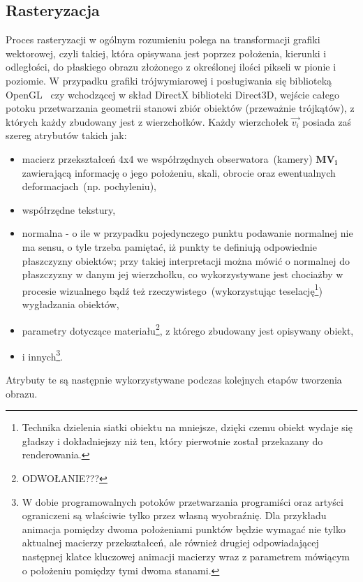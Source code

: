 \subsection{Rasteryzacja}
Proces rasteryzacji w ogólnym rozumieniu polega na transformacji grafiki wektorowej, czyli takiej, która opisywana jest poprzez położenia, kierunki i odległości, do płaskiego obrazu złożonego z określonej ilości pikseli w pionie i poziomie. W przypadku grafiki trójwymiarowej i posługiwania się biblioteką OpenGL~\cite{OPENGL46} czy wchodzącej w skład DirectX biblioteki Direct3D, wejście całego potoku przetwarzania geometrii stanowi zbiór obiektów (przeważnie trójkątów), z których każdy zbudowany jest z wierzchołków. Każdy wierzchołek $\vec{v_i}$ posiada zaś szereg atrybutów takich jak:
\begin{itemize}
\item macierz przekształceń 4x4 we współrzędnych obserwatora~(kamery) $\mathbf{MV_i}$ zawierającą informację o jego położeniu, skali, obrocie oraz ewentualnych deformacjach~(np. pochyleniu),
\item współrzędne tekstury,
\item normalna - o ile w przypadku pojedynczego punktu podawanie normalnej nie ma sensu, o tyle trzeba pamiętać, iż punkty te definiują odpowiednie płaszczyzny obiektów; przy takiej interpretacji można mówić o normalnej do płaszczyzny w danym jej wierzchołku, co wykorzystywane jest chociażby w procesie wizualnego bądź też rzeczywistego~(wykorzystując teselację\footnote{Technika dzielenia siatki obiektu na mniejsze, dzięki czemu obiekt wydaje się gładszy i dokładniejszy niż ten, który pierwotnie został przekazany do renderowania.}) wygładzania obiektów,
\item parametry dotyczące {\color{red}materiału\footnote{ODWOŁANIE???}}, z którego zbudowany jest opisywany obiekt,
\item i innych\footnote{W dobie programowalnych potoków przetwarzania programiści oraz artyści ograniczeni są właściwie tylko przez własną wyobraźnię. Dla przykładu animacja pomiędzy dwoma położeniami punktów będzie wymagać nie tylko aktualnej macierzy przekształceń, ale również drugiej odpowiadającej następnej klatce kluczowej animacji macierzy wraz z parametrem mówiącym o położeniu pomiędzy tymi dwoma stanami.}.
\end{itemize}
Atrybuty te są następnie wykorzystywane podczas kolejnych etapów tworzenia obrazu.

